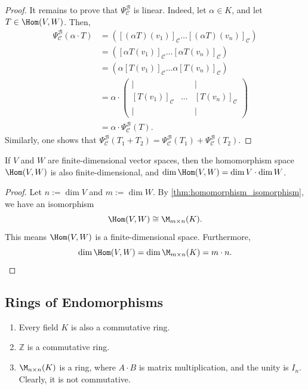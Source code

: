 \begin{proof}
  It remains to prove that $\Psi_{\mathcal{C}}^{\mathcal{B}}$ is linear. Indeed, let $\alpha \in K$, and let $T \in \Hom(V,W)$. Then,
  \begin{align*}
    \Psi_{\mathcal{C}}^{\mathcal{B}}(\alpha \cdot T) &= \left( [(\alpha T)(v_1)]_{\mathcal{C}} \dots [(\alpha T)(v_n)]_{\mathcal{C}} \right) \\
    &= \left( [\alpha T(v_1)]_{\mathcal{C}} \dots [\alpha T(v_n)]_{\mathcal{C}} \right) \\
    &= \left( \alpha [T(v_1)]_{\mathcal{C}} \dots \alpha [T(v_n)]_{\mathcal{C}} \right) \\
    &= \alpha \cdot \begin{pmatrix} | & & | \\ [T(v_1)]_{\mathcal{C}} & \dots & [T(v_n)]_{\mathcal{C}} \\ | & & | \end{pmatrix} \\
    &= \alpha \cdot \Psi_{\mathcal{C}}^{\mathcal{B}}(T).
  \end{align*}
  Similarly, one shows that $\Psi_{\mathcal{C}}^{\mathcal{B}}(T_1 + T_2) = \Psi_{\mathcal{C}}^{\mathcal{B}}(T_1) + \Psi_{\mathcal{C}}^{\mathcal{B}}(T_2)$.
\end{proof}

\begin{corollary}
  If $V$ and $W$ are finite-di\-men\-sional vector spaces, then the homomorphism space $\Hom(V,W)$ is also finite-di\-men\-sional, and $\dim \Hom(V,W) = \dim V \cdot \dim W$.
\end{corollary}

\begin{proof}
  Let $n := \dim V$ and $m := \dim W$. By \cref{thm:homomorphism_isomorphism}, we have an isomorphism
  \[
  \Hom(V,W) \cong \M_{m \times n}(K).
  \]
  This means $\Hom(V,W)$ is a finite-dimensional space. Furthermore,
  \[
  \dim \Hom(V,W) = \dim \M_{m \times n}(K) = m \cdot n.
  \]
\end{proof}

\subsection{Rings of Endomorphisms}
\begin{example}
  \begin{enumerate}
    \item Every field $K$ is also a commutative ring.
    \item $\mathbb{Z}$ is a commutative ring.
    \item $\M_{n \times n}(K)$ is a ring, where $A \cdot B$ is matrix multiplication, and the unity is $I_n$. Clearly, it is not commutative.
  \end{enumerate}
\end{example}

